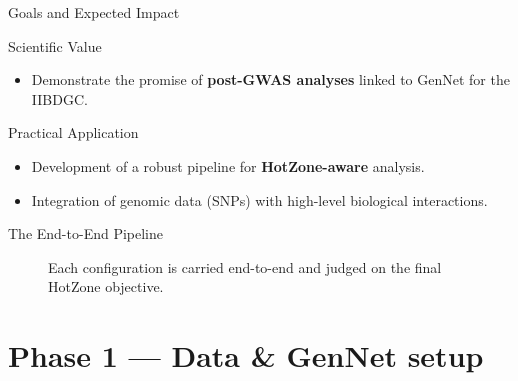 \documentclass[aspectratio=169]{beamer}
\begin{document}
\begin{frame}{Goals and Expected Impact}
    \begin{block}{Scientific Value}
        \begin{itemize}
            \item Demonstrate the promise of \textbf{post-GWAS analyses} linked to GenNet for the IIBDGC.
        \end{itemize}
    \end{block}

    \begin{block}{Practical Application}
        \begin{itemize}
            \item Development of a robust pipeline for \textbf{HotZone-aware} analysis.
            \item Integration of genomic data (SNPs) with high-level biological interactions.
        \end{itemize}
    \end{block}
\end{frame}

\begin{frame}{The End-to-End Pipeline}
    \begin{figure}
        \centering
        \caption{Each configuration is carried end-to-end and judged on the final HotZone objective.}
    \end{figure}
\end{frame}

\section{Phase 1 — Data \& GenNet setup}
\end{document}
